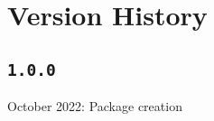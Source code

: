 \documentclass[12pt]{article}
\begin{document}
\section{Version History}
\subsection{\texttt{1.0.0}}

 October 2022: Package creation

	
\end{document}
